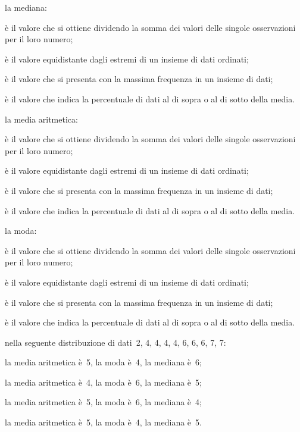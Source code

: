 \begin{esercizio}
\begin{enumerate*}
\item la mediana:
 \begin{enumeratea}
\item è il valore che si ottiene dividendo la somma dei valori delle singole osservazioni per il loro numero;
\item è il valore equidistante dagli estremi di un insieme di dati ordinati;
\item è il valore che si presenta con la massima frequenza in un insieme di dati;
\item è il valore che indica la percentuale di dati al di sopra o al di sotto della media.
 \end{enumeratea}
\item la media aritmetica:
 \begin{enumeratea}
 \item è il valore che si ottiene dividendo la somma dei valori delle singole osservazioni per il loro numero;
\item è il valore equidistante dagli estremi di un insieme di dati ordinati;
\item è il valore che si presenta con la massima frequenza in un insieme di dati;
\item è il valore che indica la percentuale di dati al di sopra o al di sotto della media.
 \end{enumeratea}
\item la moda:
 \begin{enumeratea}
\item è il valore che si ottiene dividendo la somma dei valori delle singole osservazioni per il loro numero;
\item è il valore equidistante dagli estremi di un insieme di dati ordinati;
\item è il valore che si presenta con la massima frequenza in un insieme di dati;
\item è il valore che indica la percentuale di dati al di sopra o al di sotto della media.
 \end{enumeratea}
\item nella seguente distribuzione di dati~2, 4, 4, 4, 4, 6, 6, 6, 7, 7:
 \begin{enumeratea}
\item la media aritmetica è~5, la moda è~4, la mediana è~6;
\item la media aritmetica è~4, la moda è~6, la mediana è~5;
\item la media aritmetica è~5, la moda è~6, la mediana è~4;
\item la media aritmetica è~5, la moda è~4, la mediana è~5.

\end{enumeratea}
\end{enumerate*}
\end{esercizio}
